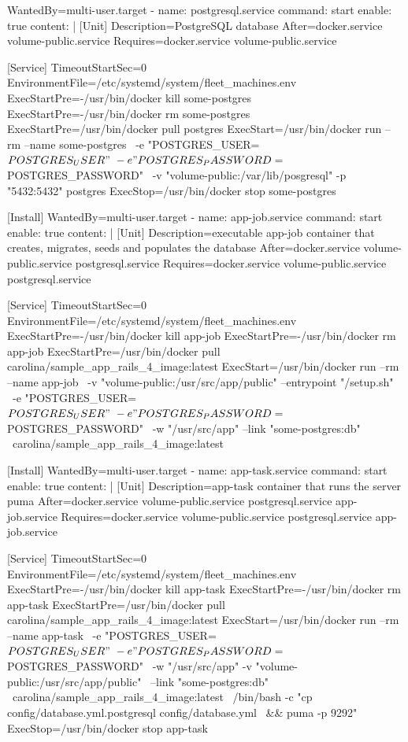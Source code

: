 \begin{codelisting}
\begin{code}
      [Install] 
      WantedBy=multi-user.target
  - name: postgresql.service
    command: start
    enable: true
    content: |
      [Unit] 
      Description=PostgreSQL database 
      After=docker.service volume-public.service
      Requires=docker.service volume-public.service

      [Service] 
      TimeoutStartSec=0
      EnvironmentFile=/etc/systemd/system/fleet_machines.env
      ExecStartPre=-/usr/bin/docker kill some-postgres 
      ExecStartPre=-/usr/bin/docker rm some-postgres 
      ExecStartPre=/usr/bin/docker pull postgres 
      ExecStart=/usr/bin/docker run --rm --name some-postgres \
      -e "POSTGRES_USER=${POSTGRES_USER}" \
      -e "POSTGRES_PASSWORD=${POSTGRES_PASSWORD}" \
      -v "volume-public:/var/lib/posgresql" -p "5432:5432" postgres 
      ExecStop=/usr/bin/docker stop some-postgres

      [Install] 
      WantedBy=multi-user.target
  - name: app-job.service
    command: start
    enable: true
    content: |
      [Unit] 
      Description=executable app-job container that creates, migrates, seeds and
                  populates the database
      After=docker.service volume-public.service postgresql.service
      Requires=docker.service volume-public.service postgresql.service

      [Service] 
      TimeoutStartSec=0 
      EnvironmentFile=/etc/systemd/system/fleet_machines.env
      ExecStartPre=-/usr/bin/docker kill app-job 
      ExecStartPre=-/usr/bin/docker rm app-job 
      ExecStartPre=/usr/bin/docker pull carolina/sample_app_rails_4_image:latest 
      ExecStart=/usr/bin/docker run --rm --name app-job \
      -v "volume-public:/usr/src/app/public" --entrypoint "/setup.sh" \
      -e "POSTGRES_USER=${POSTGRES_USER}" \
      -e "POSTGRES_PASSWORD=${POSTGRES_PASSWORD}" \
      -w "/usr/src/app" --link "some-postgres:db" \
      carolina/sample_app_rails_4_image:latest

      [Install] 
      WantedBy=multi-user.target
  - name: app-task.service
    command: start
    enable: true
    content: |
      [Unit] 
      Description=app-task container that runs the server puma
      After=docker.service volume-public.service postgresql.service
            app-job.service
      Requires=docker.service volume-public.service postgresql.service
               app-job.service

      [Service] 
      TimeoutStartSec=0 
      EnvironmentFile=/etc/systemd/system/fleet_machines.env
      ExecStartPre=-/usr/bin/docker kill app-task 
      ExecStartPre=-/usr/bin/docker rm app-task
      ExecStartPre=/usr/bin/docker pull carolina/sample_app_rails_4_image:latest 
      ExecStart=/usr/bin/docker run --rm --name app-task \
      -e "POSTGRES_USER=${POSTGRES_USER}" \
      -e "POSTGRES_PASSWORD=${POSTGRES_PASSWORD}" \
      -w "/usr/src/app" -v "volume-public:/usr/src/app/public" \
      --link "some-postgres:db" \
      carolina/sample_app_rails_4_image:latest \
      /bin/bash -c "cp config/database.yml.postgresql config/database.yml \
      && puma -p 9292"
      ExecStop=/usr/bin/docker stop app-task


\end{code}
\end{codelisting}
